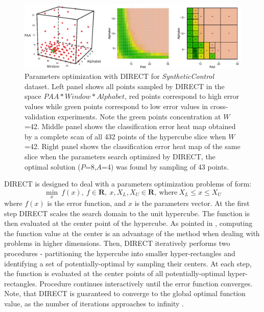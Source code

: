 \begin{figure}[t]
   \centering
   \includegraphics[width=150mm]{figures/figure_direct.eps}
   \caption{Parameters optimization with DIRECT for \textit{SyntheticControl} dataset. 
   Left panel shows all points sampled by DIRECT in the space \mbox{$PAA*Window*Alphabet$},
   red points correspond to high error values while green points correspond to low error values 
   in cross-validation experiments. 
   Note the green points concentration at $W$=42. 
   Middle panel shows the classification error heat map obtained by a complete scan 
   of all 432 points of the hypercube slice when $W$=42. 
   Right panel shows the classification error heat map of the same slice when 
   the parameters search optimized by DIRECT, 
   the optimal solution ($P$=8,$A$=4) was found by sampling of 43 points.}
   \label{fig:direct-sampling}
\end{figure}

DIRECT is designed to deal with a parameters optimization problems of form:
\begin{equation}
 \min_{x} \: f(x), \: f \in \mathbf{R}, \: x, X_{L}, X_{U} \in \mathbf{R}, \: \text{where} \: X_{L} \leq x \leq X_{U}
 \label{formula:direct}
\end{equation} 
where $f(x)$ is the error function, and $x$ is the parameters vector.
At the first step DIRECT scales the search domain to the unit hypercube. The function is then evaluated 
at the center point of the hypercube. As pointed in \cite{citeulike:12563460}, computing the function value
at the center is an advantage of the method when dealing with problems
in higher dimensions.
Then, DIRECT iteratively performs two procedures - partitioning the hypercube into smaller hyper-rectangles 
and identifying a set of potentially-optimal by sampling their centers. At each step, the function is evaluated 
at the center points of all potentially-optimal hyper-rectangles. Procedure continues interactively until the 
error function converges. Note, that DIRECT is guaranteed to converge to the global optimal function value,
as the number of iterations approaches to infinity \cite{citeulike:12563460}.

